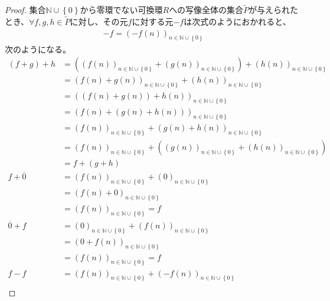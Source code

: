\documentclass[dvipdfmx]{jsarticle}
\begin{document}
\begin{proof}
集合$\mathbb{N} \cup \left\{ 0 \right\}$から零環でない可換環$R$への写像全体の集合$\widetilde{P}$が与えられたとき、$\forall f,g,h \in \widetilde{P}$に対し、その元$f$に対する元$- f$は次式のようにおかれると、
\begin{align*}
- f = \left( - f(n) \right)_{n \in \mathbb{N} \cup \left\{ 0 \right\}}
\end{align*}
次のようになる。
\begin{align*}
(f + g) + h &= \left( \left( f(n) \right)_{n \in \mathbb{N} \cup \left\{ 0 \right\}} + \left( g(n) \right)_{n \in \mathbb{N} \cup \left\{ 0 \right\}} \right) + \left( h(n) \right)_{n \in \mathbb{N} \cup \left\{ 0 \right\}}\\
&= \left( f(n) + g(n) \right)_{n \in \mathbb{N} \cup \left\{ 0 \right\}} + \left( h(n) \right)_{n \in \mathbb{N} \cup \left\{ 0 \right\}}\\
&= \left( \left( f(n) + g(n) \right) + h(n) \right)_{n \in \mathbb{N} \cup \left\{ 0 \right\}}\\
&= \left( f(n) + \left( g(n) + h(n) \right) \right)_{n \in \mathbb{N} \cup \left\{ 0 \right\}}\\
&= \left( f(n) \right)_{n \in \mathbb{N} \cup \left\{ 0 \right\}} + \left( g(n) + h(n) \right)_{n \in \mathbb{N} \cup \left\{ 0 \right\}}\\
&= \left( f(n) \right)_{n \in \mathbb{N} \cup \left\{ 0 \right\}} + \left( \left( g(n) \right)_{n \in \mathbb{N} \cup \left\{ 0 \right\}} + \left( h(n) \right)_{n \in \mathbb{N} \cup \left\{ 0 \right\}} \right)\\
&= f + (g + h)\\
f + \overline{0} &= \left( f(n) \right)_{n \in \mathbb{N} \cup \left\{ 0 \right\}} + (0)_{n \in \mathbb{N} \cup \left\{ 0 \right\}}\\
&= \left( f(n) + 0 \right)_{n \in \mathbb{N} \cup \left\{ 0 \right\}}\\
&= \left( f(n) \right)_{n \in \mathbb{N} \cup \left\{ 0 \right\}} = f\\
\overline{0} + f &= (0)_{n \in \mathbb{N} \cup \left\{ 0 \right\}} + \left( f(n) \right)_{n \in \mathbb{N} \cup \left\{ 0 \right\}}\\
&= \left( 0 + f(n) \right)_{n \in \mathbb{N} \cup \left\{ 0 \right\}}\\
&= \left( f(n) \right)_{n \in \mathbb{N} \cup \left\{ 0 \right\}} = f\\
f - f &= \left( f(n) \right)_{n \in \mathbb{N} \cup \left\{ 0 \right\}} + \left( - f(n) \right)_{n \in \mathbb{N} \cup \left\{ 0 \right\}}\\

\end{align*}
\end{proof}
\end{document}
